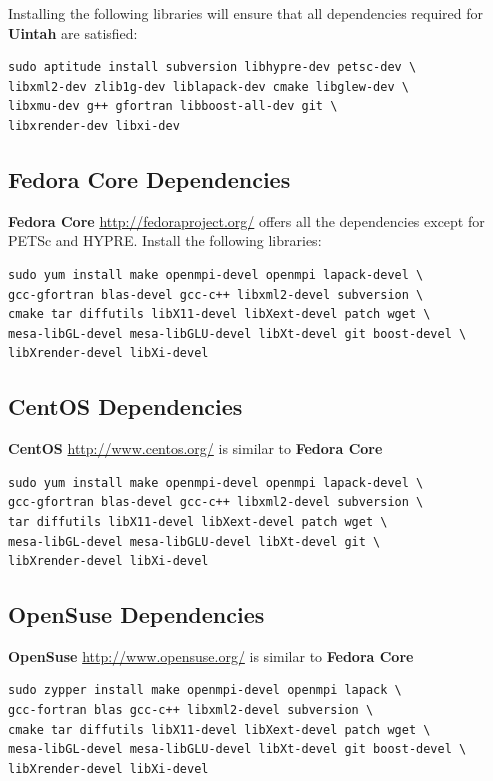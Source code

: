 \documentclass[12pt]{article}
\begin{document}
Installing the following libraries will ensure that all dependencies
required for \textbf{Uintah} are satisfied:

\begin{verbatim} 
sudo aptitude install subversion libhypre-dev petsc-dev \ 
libxml2-dev zlib1g-dev liblapack-dev cmake libglew-dev \
libxmu-dev g++ gfortran libboost-all-dev git \
libxrender-dev libxi-dev
\end{verbatim}

\subsection{Fedora Core  Dependencies}

\textbf{Fedora Core} \url{http://fedoraproject.org/} offers all the
dependencies except for PETSc and HYPRE.  Install the following
libraries:

\begin{verbatim}
sudo yum install make openmpi-devel openmpi lapack-devel \
gcc-gfortran blas-devel gcc-c++ libxml2-devel subversion \ 
cmake tar diffutils libX11-devel libXext-devel patch wget \
mesa-libGL-devel mesa-libGLU-devel libXt-devel git boost-devel \
libXrender-devel libXi-devel
\end{verbatim} 


\subsection{CentOS  Dependencies}

\textbf{CentOS} \url{http://www.centos.org/} is similar to \textbf{Fedora
Core} 

\begin{verbatim}
sudo yum install make openmpi-devel openmpi lapack-devel \
gcc-gfortran blas-devel gcc-c++ libxml2-devel subversion \ 
tar diffutils libX11-devel libXext-devel patch wget \
mesa-libGL-devel mesa-libGLU-devel libXt-devel git \
libXrender-devel libXi-devel
\end{verbatim} 


\subsection{OpenSuse  Dependencies}

\textbf{OpenSuse} \url{http://www.opensuse.org/} is similar to
\textbf{Fedora Core}

\begin{verbatim}
sudo zypper install make openmpi-devel openmpi lapack \
gcc-fortran blas gcc-c++ libxml2-devel subversion \ 
cmake tar diffutils libX11-devel libXext-devel patch wget \
mesa-libGL-devel mesa-libGLU-devel libXt-devel git boost-devel \
libXrender-devel libXi-devel
\end{verbatim} 
\end{document}
